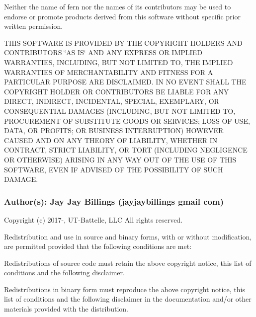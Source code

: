 Neither the name of fern nor the names of its contributors may be used to endorse or promote products derived from this software without specific prior written permission.

T\+H\+IS S\+O\+F\+T\+W\+A\+RE IS P\+R\+O\+V\+I\+D\+ED BY T\+HE C\+O\+P\+Y\+R\+I\+G\+HT H\+O\+L\+D\+E\+RS A\+ND C\+O\+N\+T\+R\+I\+B\+U\+T\+O\+RS \char`\"{}\+A\+S I\+S\char`\"{} A\+ND A\+NY E\+X\+P\+R\+E\+SS OR I\+M\+P\+L\+I\+ED W\+A\+R\+R\+A\+N\+T\+I\+ES, I\+N\+C\+L\+U\+D\+I\+NG, B\+UT N\+OT L\+I\+M\+I\+T\+ED TO, T\+HE I\+M\+P\+L\+I\+ED W\+A\+R\+R\+A\+N\+T\+I\+ES OF M\+E\+R\+C\+H\+A\+N\+T\+A\+B\+I\+L\+I\+TY A\+ND F\+I\+T\+N\+E\+SS F\+OR A P\+A\+R\+T\+I\+C\+U\+L\+AR P\+U\+R\+P\+O\+SE A\+RE D\+I\+S\+C\+L\+A\+I\+M\+ED. IN NO E\+V\+E\+NT S\+H\+A\+LL T\+HE C\+O\+P\+Y\+R\+I\+G\+HT H\+O\+L\+D\+ER OR C\+O\+N\+T\+R\+I\+B\+U\+T\+O\+RS BE L\+I\+A\+B\+LE F\+OR A\+NY D\+I\+R\+E\+CT, I\+N\+D\+I\+R\+E\+CT, I\+N\+C\+I\+D\+E\+N\+T\+AL, S\+P\+E\+C\+I\+AL, E\+X\+E\+M\+P\+L\+A\+RY, OR C\+O\+N\+S\+E\+Q\+U\+E\+N\+T\+I\+AL D\+A\+M\+A\+G\+ES (I\+N\+C\+L\+U\+D\+I\+NG, B\+UT N\+OT L\+I\+M\+I\+T\+ED TO, P\+R\+O\+C\+U\+R\+E\+M\+E\+NT OF S\+U\+B\+S\+T\+I\+T\+U\+TE G\+O\+O\+DS OR S\+E\+R\+V\+I\+C\+ES; L\+O\+SS OF U\+SE, D\+A\+TA, OR P\+R\+O\+F\+I\+TS; OR B\+U\+S\+I\+N\+E\+SS I\+N\+T\+E\+R\+R\+U\+P\+T\+I\+ON) H\+O\+W\+E\+V\+ER C\+A\+U\+S\+ED A\+ND ON A\+NY T\+H\+E\+O\+RY OF L\+I\+A\+B\+I\+L\+I\+TY, W\+H\+E\+T\+H\+ER IN C\+O\+N\+T\+R\+A\+CT, S\+T\+R\+I\+CT L\+I\+A\+B\+I\+L\+I\+TY, OR T\+O\+RT (I\+N\+C\+L\+U\+D\+I\+NG N\+E\+G\+L\+I\+G\+E\+N\+CE OR O\+T\+H\+E\+R\+W\+I\+SE) A\+R\+I\+S\+I\+NG IN A\+NY W\+AY O\+UT OF T\+HE U\+SE OF T\+H\+IS S\+O\+F\+T\+W\+A\+RE, E\+V\+EN IF A\+D\+V\+I\+S\+ED OF T\+HE P\+O\+S\+S\+I\+B\+I\+L\+I\+TY OF S\+U\+CH D\+A\+M\+A\+GE.

\subsubsection*{Author(s)\+: Jay Jay Billings (jayjaybillings  gmail  com) }



 Copyright (c) 2017-\/, U\+T-\/\+Battelle, L\+LC All rights reserved.

Redistribution and use in source and binary forms, with or without modification, are permitted provided that the following conditions are met\+:

Redistributions of source code must retain the above copyright notice, this list of conditions and the following disclaimer.

Redistributions in binary form must reproduce the above copyright notice, this list of conditions and the following disclaimer in the documentation and/or other materials provided with the distribution.

